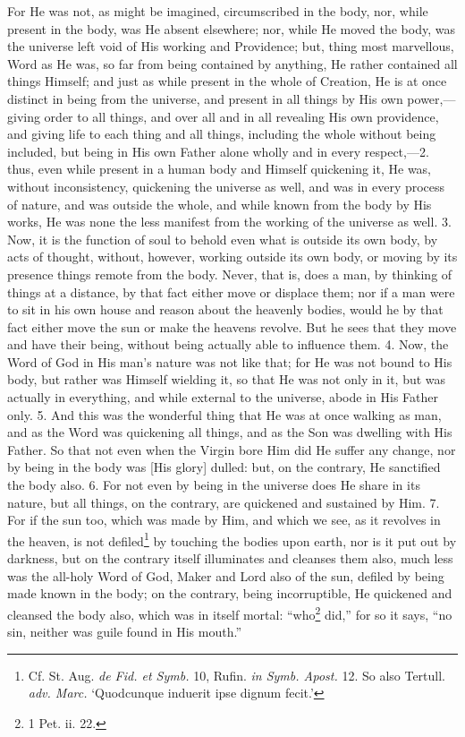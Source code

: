 For He was not, as might be imagined, circumscribed in the body, nor, while present in the body, was He absent elsewhere; nor, while He moved the body, was the universe left void of His working and Providence; but, thing most marvellous, Word as He was, so far from being contained by anything, He rather contained all things Himself; and just as while present in the whole of Creation, He is at once distinct in being from the universe, and present in all things by His own power,—giving order to all things, and over all and in all revealing His own providence, and giving life to each thing and all things, including the whole without being included, but being in His own Father alone wholly and in every respect,—2. thus, even while present in a human body and Himself quickening it, He was, without inconsistency, quickening the universe as well, and was in every process of nature, and was outside the whole, and while known from the body by His works, He was none the less manifest from the working of the universe as well. 3. Now, it is the function of soul to behold even what is outside its own body, by acts of thought, without, however, working outside its own body, or moving by its presence things remote from the body. Never, that is, does a man, by thinking of things at a distance, by that fact either move or displace them; nor if a man were to sit in his own house and reason about the heavenly bodies, would he by that fact either move the sun or make the heavens revolve. But he sees that they move and have their being, without being actually able to influence them. 4. Now, the Word of God in His man’s nature was not like that; for He was not bound to His body, but rather was Himself wielding it, so that He was not only in it, but was actually in everything, and while external to the universe, abode in His Father only. 5. And this was the wonderful thing that He was at once walking as man, and as the Word was quickening all things, and as the Son was dwelling with His Father. So that not even when the Virgin bore Him did He suffer any change, nor by being in the body was [His glory] dulled: but, on the contrary, He sanctified the body also. 6. For not even by being in the universe does He share in its nature, but all things, on the contrary, are quickened and sustained by Him. 7. For if the sun too, which was made by Him, and which we see, as it revolves in the heaven, is not defiled\footnote{Cf. St. Aug. \emph{de Fid. et Symb.} 10, Rufin. \emph{in Symb. Apost.} 12. So also Tertull. \emph{adv. Marc.} ‘Quodcunque induerit ipse dignum fecit.’} by touching the bodies upon earth, nor is it put out by darkness, but on the contrary itself illuminates and cleanses them also, much less was the all-holy Word of God, Maker and Lord also of the sun, defiled by being made known in the body; on the contrary, being incorruptible, He quickened and cleansed the body also, which was in itself mortal: “who\footnote{1 Pet. ii. 22.} did,” for so it says, “no sin, neither was guile found in His mouth.”

